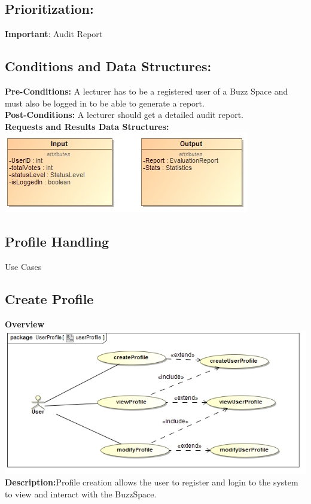 \documentclass[a4paper,11pt]{article}
\begin{document}
\subsection{Prioritization:} 
\textbf{Important}: Audit Report
\subsection{Conditions and Data Structures:}
\textbf{Pre-Conditions:}
A lecturer has to be a registered user of a Buzz Space and must also be logged in to be able to generate a report.\\
\textbf{Post-Conditions:}
A lecturer should get a detailed audit report.\\
\textbf{Requests and Results Data Structures:}
\includegraphics{Images/Report/Input&Output}

\newpage
\begin{center}
\section{\textbf{\huge{Profile Handling}}}
\Large{Use Cases}
\end{center}

\subsection{Create Profile}
\textbf{Overview}\\
\includegraphics[width=1\linewidth]{./Images/OverviewDiagrams/ProfileHandling.jpg}\\
\textbf{Description:}Profile creation allows the user to register and login to the system to view and interact with the BuzzSpace.
\end{document}
